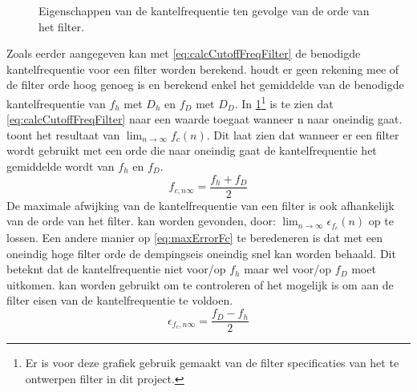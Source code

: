 \begin{figure}[!htbp]
    \centering
    
    \caption{Eigenschappen van de kantelfrequentie ten gevolge van de orde van het filter.}
    \label{fig:fcEigenschappenTengevolgeVanN}
\end{figure}
Zoals eerder aangegeven kan met \cref{eq:calcCutoffFreqFilter} de benodigde kantelfrequentie voor een filter worden berekend.  houdt er geen rekening mee of de filter orde hoog genoeg is en berekend enkel het gemiddelde van de benodigde kantelfrequentie van $f_h$ met $D_h$ en $f_D$ met $D_D$. In \cref{fig:fcEigenschappenTengevolgeVanN}\footnote{Er is voor deze grafiek gebruik gemaakt van de filter specificaties van het te ontwerpen filter in dit project.} is te zien dat \cref{eq:calcCutoffFreqFilter} naar een waarde toegaat wanneer n naar oneindig gaat.  toont het resultaat van $\lim_{n\rightarrow\infty}f_c\left(n\right)$. Dit laat zien dat wanneer er een filter wordt gebruikt met een orde die naar oneindig gaat de kantelfrequentie het gemiddelde wordt van $f_h$ en $f_D$.
\begin{equation}\label{eq:limietCutoffFreqNtoInfty}
    f_{c,n\infty}=\frac{f_h+f_D}{2}
\end{equation}
De maximale afwijking van de kantelfrequentie van een filter is ook afhankelijk van de orde van het filter.  kan worden gevonden, door: $\lim_{n\rightarrow\infty}\epsilon_{f_c}\left(n\right)$ op te lossen. Een andere manier op \cref{eq:maxErrorFc} te beredeneren is dat met een oneindig hoge filter orde de dempingseis oneindig snel kan worden behaald. Dit beteknt dat de kantelfrequentie niet voor/op $f_h$ maar wel voor/op $f_D$ moet uitkomen.  kan worden gebruikt om te controleren of het mogelijk is om aan de filter eisen van de kantelfrequentie te voldoen.
\begin{equation}\label{eq:maxErrorFc}
    \epsilon_{f_c,n\infty}=\frac{f_D-f_h}{2}
\end{equation}



